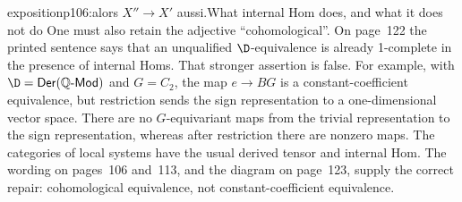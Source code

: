 \begin{dcomment}{exposition}{p106:alors $X'' \to X'$ aussi.}{What internal Hom does, and what it does not do}
One must also retain the adjective ``cohomological''. On page~122 the printed sentence says that an unqualified $\D$-equivalence is already 1-complete in the presence of internal Homs. That stronger assertion is false. For example, with $\D=\mathsf{Der}(\mathbb Q\text{-}\mathsf{Mod})$ and $G=C_2$, the map $e\to BG$ is a constant-coefficient equivalence, but restriction sends the sign representation to a one-dimensional vector space. There are no $G$-equivariant maps from the trivial representation to the sign representation, whereas after restriction there are nonzero maps. The categories of local systems have the usual derived tensor and internal Hom. The wording on pages~106 and~113, and the diagram on page~123, supply the correct repair: cohomological equivalence, not constant-coefficient equivalence.
\end{dcomment}

